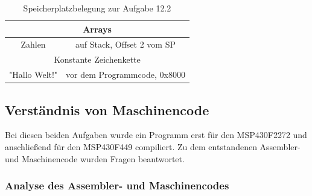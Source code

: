 \documentclass[12pt,a4paper,bibliography=totocnumbered,listof=totocnumbered]{scrartcl}
\begin{document}
\begin{table}[]
\begin{tabular}{|c|c|}
		\multicolumn{2}{|c|}{Arrays}                                                                                                    \\ \hline
		Zahlen                                                      & auf Stack, Offset 2 vom SP                                        \\ \hline \hline
		\multicolumn{2}{|c|}{Konstante Zeichenkette}                                                                                    \\ \hline
		"Hallo Welt!"                                               & vor dem Programmcode, 0x8000                                      \\ \hline
	\end{tabular}
	\caption{Speicherplatzbelegung zur Aufgabe 12.2}
\end{table}


\subsection{Verständnis von Maschinencode}
Bei diesen beiden Aufgaben wurde ein Programm erst für den MSP430F2272 und anschließend für den MSP430F449 compiliert. Zu dem entstandenen Assembler- und Maschinencode wurden Fragen beantwortet.
\subsubsection{Analyse des Assembler- und Maschinencodes}
\end{document}
